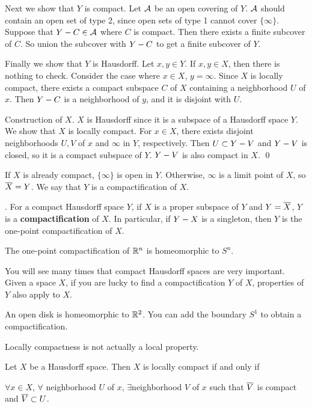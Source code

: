 Next we show that \(Y\) is compact. Let \(\mathcal{A}\) be an open covering of \(Y\). \(\mathcal{A}\) should contain an open set of type 2, since open sets of type 1 cannot cover \(\{\infty\}\). Suppose that \(Y - C \in \mathcal{A}\) where \(C\) is compact. Then there exists a finite subcover of \(C\). So union the subcover with \(Y - C\) to get a finite subcover of \(Y\).

Finally we show that \(Y\) is Hausdorff. Let \(x, y \in Y\). If \(x, y \in X\), then there is nothing to check. Consider the case where \(x \in X\), \(y = \infty\). Since \(X\) is locally compact, there exists a compact subspace \(C\) of \(X\) containing a neighborhood \(U\) of \(x\). Then \(Y - C\) is a neighborhood of \(y\), and it is disjoint with \(U\).

 \note{\mimpd} Construction of \(X\).
\(X\) is Hausdorff since it is a subspace of a Hausdorff space \(Y\). We show that \(X\) is locally compact. For \(x \in X\), there exists disjoint neighborhoods \(U, V\) of \(x\) and \(\infty\) in \(Y\), respectively. Then \(U \subset Y - V\) and \(Y - V\) is closed, so it is a compact subspace of \(Y\). \(Y - V\) is also compact in \(X\). \qed

\pagebreak

\rmk If \(X\) is already compact, \(\{\infty\}\) is open in \(Y\). Otherwise, \(\infty\) is a limit point of \(X\), so \(\overline{X} = Y\). We say that \(Y\) is a compactification of \(X\).

.  For a compact Hausdorff space \(Y\), if \(X\) is a proper subspace of \(Y\) and \(Y = \overline{X}\), \(Y\) is a \textbf{compactification} of \(X\). In particular, if \(Y - X\) is a singleton, then \(Y\) is the one-point compactification of \(X\).

\rmk The one-point compactification of \(\mathbb{R}^n\) is homeomorphic to \(S^n\).

You will see many times that compact Hausdorff spaces are very important. Given a space \(X\), if you are lucky to find a compactification \(Y\) of \(X\), properties of \(Y\) also apply to \(X\).

An open disk is homeomorphic to \(\mathbb{R}^2\). You can add the boundary \(S^1\) to obtain a compactification.

Locally compactness is not actually a local property.

 Let \(X\) be a Hausdorff space. Then \(X\) is locally compact if and only if
\begin{center}
    \(\forall x\in X\), \(\forall\) neighborhood \(U\) of \(x\), \(\exists\)neighborhood \(V\) of \(x\) such that \(\overline{V}\) is compact and \(\overline{V} \subset U\).
\end{center}

